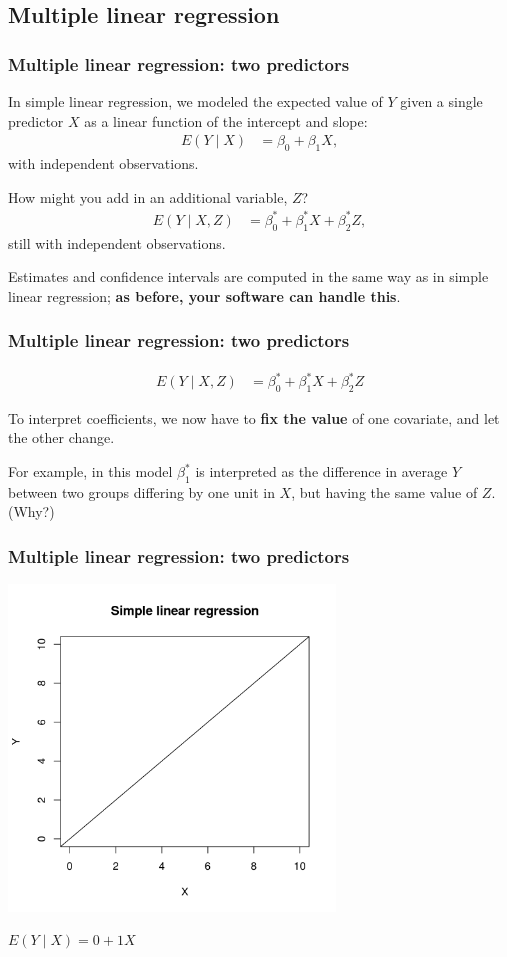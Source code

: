 \documentclass[12pt, 
hyperref={colorlinks=true, linkcolor=blue, urlcolor=cyan}]{beamer}
\begin{document}
\subsection{Multiple linear regression}
\begin{frame}
\frametitle{Multiple linear regression: two predictors}
In simple linear regression, we modeled the expected value of $Y$ given a single predictor $X$ as a linear function of the intercept and slope:
\begin{align*}
E(Y \mid X) &= \beta_0 + \beta_1 X,
\end{align*}
with independent observations.

How might you add in an additional variable, $Z$? \pause
\begin{align*}
E(Y \mid X, Z) &= \beta_0^* + \beta_1^* X + \beta_2^* Z,
\end{align*}
still with independent observations.

Estimates and confidence intervals are computed in the same way as in simple linear regression; \textbf{as before, your software can handle this}.
\end{frame}

\begin{frame}
\frametitle{Multiple linear regression: two predictors}
\begin{align*}
E(Y \mid X, Z) &= \beta_0^* + \beta_1^* X + \beta_2^* Z
\end{align*}

To interpret coefficients, we now have to \textbf{fix the value} of one covariate, and let the other change.

For example, in this model $\beta_1^*$ is interpreted as the difference in average $Y$ between two groups differing by one unit in $X$, but having the same value of $Z$. (Why?)

\end{frame}

\begin{frame}
\frametitle{Multiple linear regression: two predictors}
\centering
\includegraphics[width = 0.65\textwidth]{plots/simple_line.png}

$E(Y \mid X) = 0 + 1 X$
\end{frame}
\end{document}

